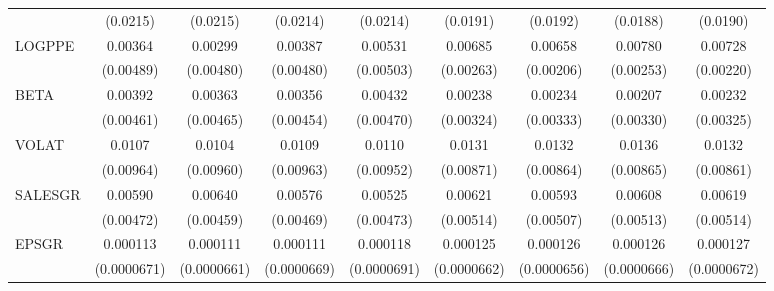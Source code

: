 \begin{table}[htbp]
\begin{tabular}{l*{8}{c}}
                    &    (0.0215)         &    (0.0215)         &    (0.0214)         &    (0.0214)         &    (0.0191)         &    (0.0192)         &    (0.0188)         &    (0.0190)         \\
LOGPPE              &     0.00364         &     0.00299         &     0.00387         &     0.00531         &     0.00685\sym{**} &     0.00658\sym{***}&     0.00780\sym{***}&     0.00728\sym{***}\\
                    &   (0.00489)         &   (0.00480)         &   (0.00480)         &   (0.00503)         &   (0.00263)         &   (0.00206)         &   (0.00253)         &   (0.00220)         \\
BETA                &     0.00392         &     0.00363         &     0.00356         &     0.00432         &     0.00238         &     0.00234         &     0.00207         &     0.00232         \\
                    &   (0.00461)         &   (0.00465)         &   (0.00454)         &   (0.00470)         &   (0.00324)         &   (0.00333)         &   (0.00330)         &   (0.00325)         \\
VOLAT               &      0.0107         &      0.0104         &      0.0109         &      0.0110         &      0.0131         &      0.0132         &      0.0136         &      0.0132         \\
                    &   (0.00964)         &   (0.00960)         &   (0.00963)         &   (0.00952)         &   (0.00871)         &   (0.00864)         &   (0.00865)         &   (0.00861)         \\
SALESGR             &     0.00590         &     0.00640         &     0.00576         &     0.00525         &     0.00621         &     0.00593         &     0.00608         &     0.00619         \\
                    &   (0.00472)         &   (0.00459)         &   (0.00469)         &   (0.00473)         &   (0.00514)         &   (0.00507)         &   (0.00513)         &   (0.00514)         \\
EPSGR               &    0.000113\sym{*}  &    0.000111\sym{*}  &    0.000111         &    0.000118\sym{*}  &    0.000125\sym{*}  &    0.000126\sym{*}  &    0.000126\sym{*}  &    0.000127\sym{*}  \\
                    & (0.0000671)         & (0.0000661)         & (0.0000669)         & (0.0000691)         & (0.0000662)         & (0.0000656)         & (0.0000666)         & (0.0000672)         \\

\end{tabular}
\end{table}
